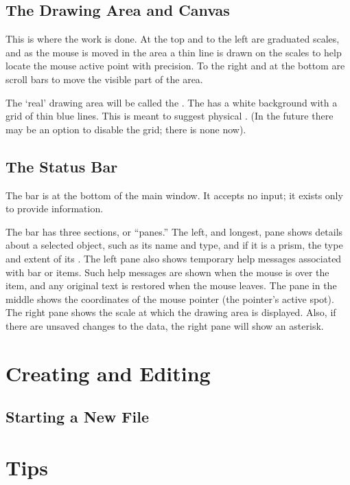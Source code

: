 		\subsection{The Drawing Area and Canvas}%
		This is where the work is done. At the top and
		to the left are graduated scales, and as the mouse
		is moved in the  area a thin line
		is drawn on the scales to help locate the mouse active
		point with precision. To the right and at the bottom
		are scroll bars to move the visible part of the
		 area.
		
		The `real' drawing area will be called the
		.
		The  has a white background with a grid
		of thin blue lines. This is meant to suggest physical
		. (In the future there
		may be an option to disable the grid; there is none now).


		\subsection{The Status Bar}%
		The  bar is at the bottom of
		the main window. It accepts no input; it exists
		only to provide information.
		
		The 
		bar has three sections, or ``panes.'' The left, and
		longest, pane shows details about a selected object,
		such as its name and type, and if it is a prism, the
		type and extent of its . The left
		pane also shows temporary help messages associated
		with  bar or  items. Such help
		messages are shown when the mouse is over the item, and
		any original text is restored when the mouse leaves.
		The pane in the middle shows the coordinates of the
		mouse pointer (the pointer's active spot). The right
		pane shows the scale at which the drawing area is displayed.
		Also, if there are unsaved changes to the data, the
		right pane will show an asterisk.


	\section{Creating and Editing}%

		\subsection{Starting a New File}%

	\section{Tips}%


